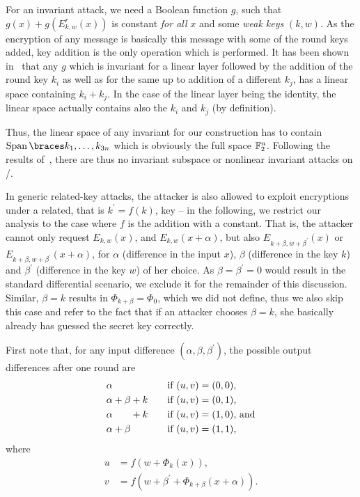 For an invariant attack, we need a Boolean function $g$, such that $g(x) + g(E_{k,w}^r(x))$ is constant \emph{for all} $x$ and some \emph{weak keys} $(k,w)$.
As the encryption of any message is basically this message with some of the round keys added, key addition is the only operation which is performed.
It has been shown in~\cite[Proposition~1]{C:BCLR17} that any $g$ which is invariant for a linear layer followed by the addition of the round key $k_i$ as well as for the same up to addition of a different $k_j$, has a linear space containing $k_i + k_j$.
In the case of the linear layer being the identity, the linear space actually contains also the $k_i$ and $k_j$ (by definition).

Thus, the linear space of any invariant for our construction has to contain $\Span{k_1, \ldots, k_{3n}}$ which is obviously the full space $\mathbb{F}_2^n$.
Following the results of~\cite{C:BCLR17}, there are thus no invariant subspace or nonlinear invariant attacks on \bison/.

In generic related-key attacks, the attacker is also allowed to exploit encryptions under a related, that is $k^\prime = f(k)$, key -- in the following, we restrict our analysis to the case where $f$ is the addition with a constant.
That is, the attacker cannot only request $E_{k,w}(x)$, and $E_{k,w}(x + \alpha)$, but also $E_{k+\beta,w+\beta^\prime}(x)$ or $E_{k+\beta,w+\beta^\prime}(x + \alpha)$, for $\alpha$ (difference in the input $x$), $\beta$ (difference in the key $k$) and $\beta^\prime$ (difference in the key $w$) of her choice.
As $\beta = \beta^\prime = 0$ would result in the standard differential scenario, we exclude it for the remainder of this discussion.
Similar, $\beta = k$ results in $\Phi_{k+\beta} = \Phi_0$, which we did not define, thus we also skip this case and refer to the fact that if an attacker chooses $\beta = k$, she basically already has guessed the secret key correctly.

First note that, for any input difference $(\alpha, \beta, \beta^\prime)$, the possible output differences after one round are
\begin{align*}
    &\alpha                                      \quad &&\text{if $(u, v) = (0, 0)$,} \\
    &\alpha + \beta + k                          \quad &&\text{if $(u, v) = (0, 1)$,} \\
    &\alpha \hphantom{+ \beta\hspace{4.5pt}} + k \quad &&\text{if $(u, v) = (1, 0)$, and} \\
    &\alpha + \beta                              \quad &&\text{if $(u, v) = (1, 1)$,}
\end{align*}
where
\begin{align}
u &= f(w + \Phi_{k}(x)), \label{bison:eqn:u}\\
v &= f(w + \beta^\prime + \Phi_{k + \beta}(x + \alpha)). \label{bison:eqn:v}
\end{align}

